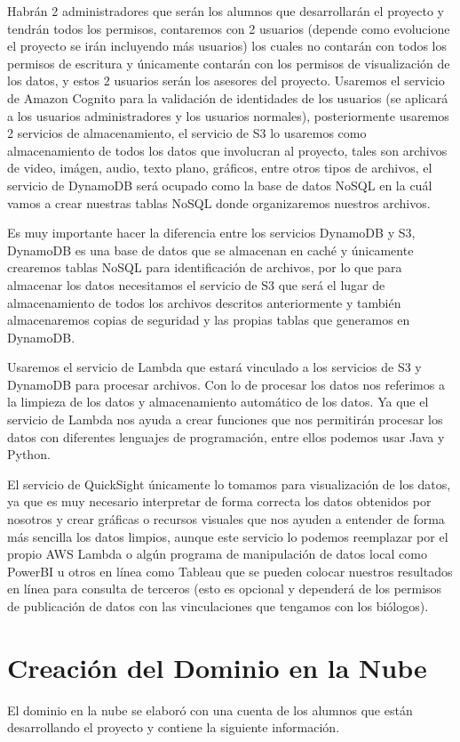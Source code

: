 Habrán 2 administradores que serán los alumnos que desarrollarán el proyecto y tendrán todos los permisos, contaremos con 2 usuarios (depende como evolucione el proyecto se irán incluyendo más usuarios) los cuales no contarán con todos los permisos de escritura y únicamente contarán con los permisos de visualización de los datos, y estos 2 usuarios serán los asesores del proyecto. Usaremos el servicio de Amazon Cognito para la validación de identidades de los usuarios (se aplicará a los usuarios administradores y los usuarios normales), posteriormente usaremos 2 servicios de almacenamiento, el servicio de S3 lo usaremos como almacenamiento de todos los datos que involucran al proyecto, tales son archivos de video, imágen, audio, texto plano, gráficos, entre otros tipos de archivos, el servicio de DynamoDB será ocupado como la base de datos NoSQL en la cuál vamos a crear nuestras tablas NoSQL donde organizaremos nuestros archivos.

Es muy importante hacer la diferencia entre los servicios DynamoDB y S3, DynamoDB es una base de datos que se almacenan en caché y únicamente crearemos tablas NoSQL para identificación de archivos, por lo que para almacenar los datos necesitamos el servicio de S3 que será el lugar de almacenamiento de todos los archivos descritos anteriormente y también almacenaremos copias de seguridad y las propias tablas que generamos en DynamoDB.

Usaremos el servicio de Lambda que estará vinculado a los servicios de S3 y DynamoDB para procesar archivos. Con lo de procesar los datos nos referimos a la limpieza de los datos y almacenamiento automático de los datos. Ya que el servicio de Lambda nos ayuda a crear funciones que nos permitirán procesar los datos con diferentes lenguajes de programación, entre ellos podemos usar Java y Python.

El servicio de QuickSight únicamente lo tomamos para visualización de los datos, ya que es muy necesario interpretar de forma correcta los datos obtenidos por nosotros y crear gráficas o recursos visuales que nos ayuden a entender de forma más sencilla los datos limpios, aunque este servicio lo podemos reemplazar por el propio AWS Lambda o algún programa de manipulación de datos local como PowerBI u otros en línea como Tableau que se pueden colocar nuestros resultados en línea para consulta de terceros (esto es opcional y dependerá de los permisos de publicación de datos con las vinculaciones que tengamos con los biólogos).

\newpage
\section{Creación del Dominio en la Nube}
El dominio en la nube se elaboró con una cuenta de los alumnos que están desarrollando el proyecto y contiene la siguiente información.


